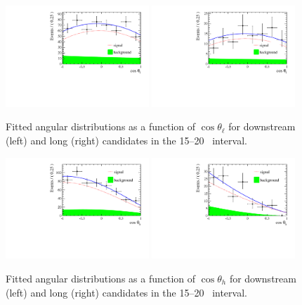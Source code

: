 \begin{figure}[h]
\centering
\includegraphics[width=0.48\textwidth]{Lmumu/figs/AngularDistribs/Fitted/Afb_DD_q2_1500_2000.pdf}
\includegraphics[width=0.48\textwidth]{Lmumu/figs/AngularDistribs/Fitted/Afb_LL_q2_1500_2000.pdf}
\caption{Fitted angular distributions as a function of $\cos\theta_\ell$ for downstream
 (left) and long (right) candidates in the 15--20 \gevgevcccc ~\qsq interval.  }
\label{fig:AngFit}
\end{figure}

\begin{figure}[h]
\centering
\includegraphics[width=0.48\textwidth]{Lmumu/figs/AngularDistribs/Fitted/AfbB_DD_q2_1500_2000.pdf}
\includegraphics[width=0.48\textwidth]{Lmumu/figs/AngularDistribs/Fitted/AfbB_LL_q2_1500_2000.pdf}
\caption{Fitted angular distributions as a function of $\cos\theta_h$ for downstream
 (left) and long (right) candidates in the 15--20 \gevgevcccc ~\qsq interval.  }
 \label{fig:AngFitB}
\end{figure}



